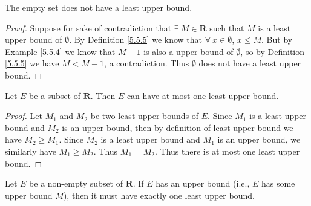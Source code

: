 \setcounter{theorem}{6}
\begin{example}\label{5.5.7}
    The empty set does not have a least upper bound.
\end{example}

\begin{proof}
    Suppose for sake of contradiction that \(\exists\ M \in \mathbf{R}\) such that \(M\) is a least upper bound of \(\emptyset\).
    By Definition \ref{5.5.5} we know that \(\forall\ x \in \emptyset\), \(x \leq M\).
    But by Example \ref{5.5.4} we know that \(M - 1\) is also a upper bound of \(\emptyset\), so by Definition \ref{5.5.5} we have \(M < M - 1\), a contradiction.
    Thus \(\emptyset\) does not have a least upper bound.
\end{proof}

\begin{proposition}\label{5.5.8}
    Let \(E\) be a subset of \(\mathbf{R}\).
    Then \(E\) can have at most one least upper bound.
\end{proposition}

\begin{proof}
    Let \(M_1\) and \(M_2\) be two least upper bounds of \(E\).
    Since \(M_1\) is a least upper bound and \(M_2\) is an upper bound, then by definition of least upper bound we have \(M_2 \geq M_1\).
    Since \(M_2\) is a least upper bound and \(M_1\) is an upper bound, we similarly have \(M_1 \geq M_2\).
    Thus \(M_1 = M_2\).
    Thus there is at most one least upper bound.
\end{proof}

\begin{theorem}\label{5.5.9}
    Let \(E\) be a non-empty subset of \(\mathbf{R}\).
    If \(E\) has an upper bound (i.e., \(E\) has some upper bound \(M\)), then it must have exactly one least upper bound.
\end{theorem}

